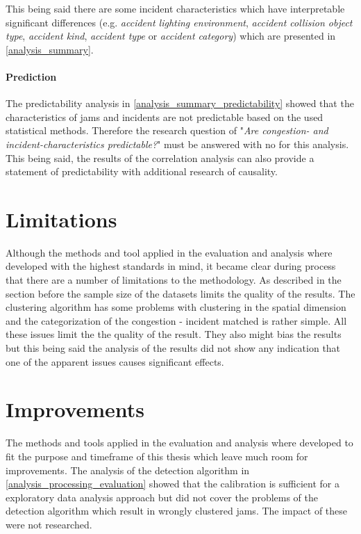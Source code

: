 This being said there are some incident characteristics which have interpretable significant differences (e.g. \textit{accident lighting environment}, \textit{accident collision object type}, \textit{accident kind}, \textit{accident type} or \textit{accident category}) which are presented in \cref{analysis_summary}.

\paragraph{Prediction} The predictability analysis in \cref{analysis_summary_predictability} showed that the characteristics of jams and incidents are not predictable based on the used statistical methods. Therefore the research question of "\textit{Are congestion- and incident-characteristics predictable?}" must be answered with no for this analysis. This being said, the results of the correlation analysis can also provide a statement of predictability with additional research of causality.

\section{Limitations}
Although the methods and tool applied in the evaluation and analysis where developed with the highest standards in mind, it became clear during process that there are a number of limitations to the methodology. As described in the section before the sample size of the datasets limits the quality of the results. The clustering algorithm has some problems with clustering in the spatial dimension and the categorization of the congestion - incident matched is rather simple. All these issues limit the the quality of the result. They also might bias the results but this being said the analysis of the results did not show any indication that one of the apparent issues causes significant effects.

\section{Improvements} 
The methods and tools applied in the evaluation and analysis where developed to fit the purpose and timeframe of this thesis which leave much room for improvements. The analysis of the detection algorithm in \cref{analysis_processing_evaluation} showed that the calibration is sufficient for a exploratory data analysis approach but did not cover the problems of the detection algorithm which result in wrongly clustered jams. The impact of these were not researched.

